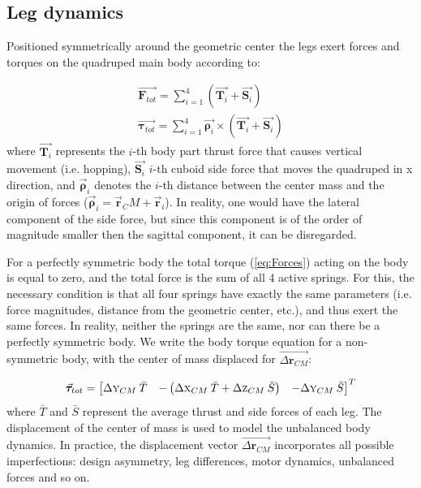 \subsection{Leg dynamics}


Positioned symmetrically around the geometric center the legs exert forces and torques on the quadruped main body according to:

\begin{gather}\label{eq:Forces}
\vec{\textbf{F}_{tot}}=\sum_{i=1}^{4}(\vec{\textbf{T}_{i}}+\vec{\textbf{S}_{i}})\\
\vec{\boldsymbol{\tau}_{tot}}=\sum_{i=1}^{4}\vec{\boldsymbol{\rho} _i}\times(\vec{\textbf{T}_{i}}+\vec{\textbf{S}_{i}})
\end{gather}  
where $\vec{\textbf{T}_{i}}$ represents the $i$-th body part thrust force that causes vertical movement (i.e. hopping), $\vec{\textbf{S}_{i}}$ $i$-th cuboid side force that moves the quadruped in x direction, and $\vec{\boldsymbol{\rho}} _i$ denotes the $i$-th distance between the center mass and the origin of forces ($\vec{\boldsymbol{\rho}} _i=\vec{\textbf{r}} _CM+\vec{\textbf{r}} _i$). In reality, one would have the lateral component of the side force, but since this component is of the order of magnitude smaller then the sagittal component, it can be disregarded.

For a perfectly symmetric body the total torque (\ref{eq:Forces}) acting on the body is equal to zero, and the total force is the sum of all 4 active springs. For this, the necessary condition is that all four springs have exactly the same parameters (i.e. force magnitudes, distance from the geometric center, etc.), and thus exert the same forces. In reality, neither the springs are the same, nor can there be a perfectly symmetric body. We write the body torque equation for a non-symmetric body, with the center of mass displaced for $\vec{\Delta\textbf{r}_{CM}}$:

\begin{equation}\label{eq:Torques}
\vec{\boldsymbol{\tau}}_{tot}=\begin{bmatrix}
\Delta \textsc{y}_{CM} \:\bar{T} & -\left ( \Delta \textsc{x}_{CM} \:\bar{T} +\Delta \textsc{z}_{CM} \:\bar{S}\right ) & -\Delta \textsc{y}_{CM} \:\bar{S}
\end{bmatrix}^T
\end{equation}
where $\bar{T}$ and $\bar{S}$ represent the average thrust and side forces of each leg. The displacement of the center of mass is used to model the unbalanced body dynamics. In practice, the displacement vector  $\vec{\Delta\textbf{r}_{CM}}$ incorporates all possible imperfections: design asymmetry, leg differences, motor dynamics, unbalanced  forces and so on.

